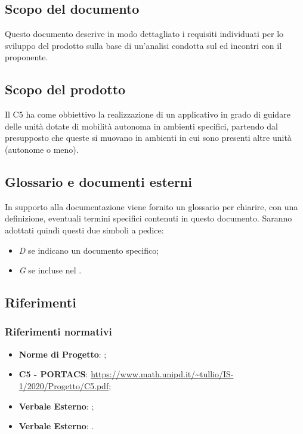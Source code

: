 \subsection{Scopo del documento}
Questo documento descrive in modo dettagliato i requisiti individuati per lo sviluppo del prodotto sulla base di un'analisi condotta sul  ed incontri con il proponente.

\subsection{Scopo del prodotto}
Il  C5 ha come obbiettivo la realizzazione di un applicativo  in grado di guidare delle unità dotate di mobilità autonoma in ambienti specifici, partendo dal presupposto che queste si muovano in ambienti in cui sono presenti altre unità (autonome o meno).

\subsection{Glossario e documenti esterni}
In supporto alla documentazione viene fornito un glossario per chiarire, con una definizione, eventuali termini specifici contenuti in questo documento.
Saranno adottati quindi questi due simboli a pedice:
\begin{itemize}
    \item \textit{D} se indicano un documento specifico;
    \item \textit{G} se incluse nel .
\end{itemize}

\subsection{Riferimenti}
    \subsubsection{Riferimenti normativi}
    \begin{itemize}
        \item \textbf{Norme di Progetto}: ;
        \item \textbf{{ C5 - PORTACS}}: \url{https://www.math.unipd.it/~tullio/IS-1/2020/Progetto/C5.pdf};
        \item \textbf{Verbale Esterno}: ;
        \item \textbf{Verbale Esterno}: .
    \end{itemize}
